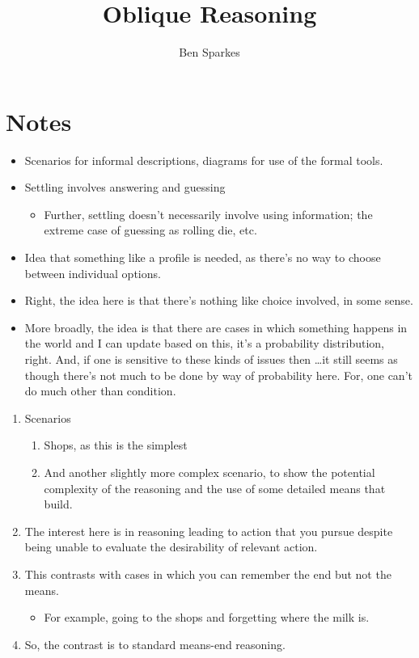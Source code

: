 \documentclass[10pt]{article}
\title{Oblique Reasoning}
\author{Ben Sparkes}
\begin{document}
\section*{Notes}



\begin{itemize}
\item Scenarios for informal descriptions, diagrams for use of the formal tools.
\item Settling involves answering and guessing
  \begin{itemize}
  \item Further, settling doesn't necessarily involve using information; the extreme case of guessing as rolling die, etc.
  \end{itemize}
\end{itemize}

\begin{itemize}
\item Idea that something like a profile is needed, as there's no way to choose between individual options.
\item Right, the idea here is that there's nothing like choice involved, in some sense.
\item More broadly, the idea is that there are cases in which something happens in the world and I can update based on this, it's a probability distribution, right.
  And, if one is sensitive to these kinds of issues then \dots it still seems as though there's not much to be done by way of probability here.
  For, one can't do much other than condition.
\end{itemize}

\newpage

\begin{enumerate}
\item Scenarios
  \begin{enumerate}
  \item Shops, as this is the simplest
  \item And another slightly more complex scenario, to show the potential complexity of the reasoning and the use of some detailed means that build.
  \end{enumerate}
\item The interest here is in reasoning leading to action that you pursue despite being unable to evaluate the desirability of relevant action.
\item This contrasts with cases in which you can remember the end but not the means.
  \begin{itemize}
  \item For example, going to the shops and forgetting where the milk is.
  \end{itemize}
\item So, the contrast is to standard means-end reasoning.
\end{enumerate}
\end{document}
